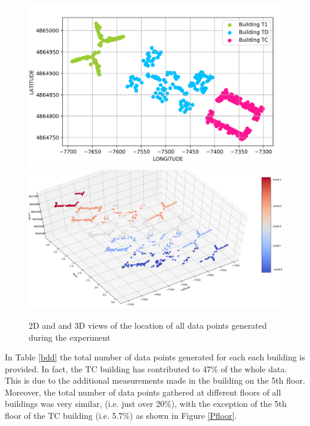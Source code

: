 \begin{figure}[!ht]
    \centering
    \includegraphics[width = 7 cm]{image/Chapters/Chapter6/LatLong.png}\hfill
    \includegraphics[width = 8 cm]{image/Chapters/Chapter6/LatLongFloor.png}
    \\[\smallskipamount]    
    \caption{ 2D and and 3D views of the location of all data points generated during the experiment}
    \label{nama}
\end{figure}

In Table \ref{bdd} the total number of data points generated for each each building is provided. In fact, the TC building has contributed to 47\% of the whole data. This is due to the additional measurements made in the building on the 5th floor. Moreover, the total number of data points gathered at different floors of all buildings was very similar, (i.e. just over 20\%), with the exception of the 5th floor of the TC building (i.e. 5.7\%) as shown in Figure \ref{Pfloor}. 




